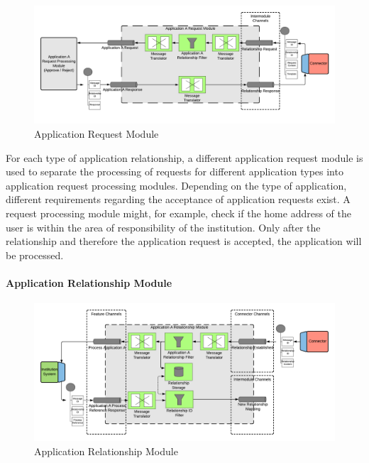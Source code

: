 \begin{figure}[H]
    \centering
    \includegraphics[scale=0.6]{Diagrams/Integration Architecture 2/Technological Integration/5. Application Request Module.pdf}
    \caption{Application Request Module}
    \label{integration2:application_request_module}
\end{figure}

For each type of application relationship, a different application request module is used to separate the processing of requests for different application types into application request processing modules. Depending on the type of application, different requirements regarding the acceptance of application requests exist. A request processing module might, for example, check if the home address of the user is within the area of responsibility of the institution. Only after the relationship and therefore the application request is accepted, the application will be processed.

\paragraph{Application Relationship Module}

\begin{figure}[H]
    \centering
    \includegraphics[scale=0.6]{Diagrams/Integration Architecture 2/Technological Integration/6. Application Relationship Module.pdf}
    \caption{Application Relationship Module}
    \label{integration2:application_relationship_module}
\end{figure}


